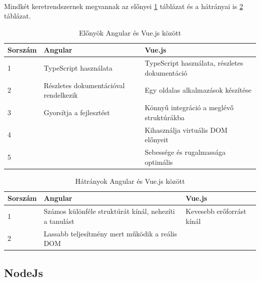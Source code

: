 	\paragraph{}
	Mindkét keretrendszernek megvannak az előnyei \ref{tab:table1} táblázat és a hátrányai is \ref{tab:table2} táblázat. 
	\begin{table}[H]
	\begin{footnotesize}
		\begin{center}
			\caption{Előnyök Angular és Vue.js között \cite{vuevsang} }
			\label{tab:table1}
			\begin{tabular}{p{2cm}|p{6cm}|p{6cm}}
				\textbf{Sorszám} & \textbf{Angular} & \textbf{Vue.js}\\
				\hline
				1 & TypeScript használata & TypeScript használata, részletes dokumentáció\\
				\hline
				2 & Részletes dokumentációval rendelkezik & Egy oldalas alkalmazások készítése \\
				\hline
				3 & Gyorsítja a fejlesztést & Könnyű integráció a meglévő struktúrákba \\
				\hline
				4 & & Kihasználja virtuális DOM előnyeit \\
				\hline
				5 & & Sebessége és rugalmassága optimális \\
			\end{tabular}
		\end{center}
	\end{footnotesize}
	\end{table}

	\begin{table}[H]
	\begin{footnotesize}
		\begin{center}
			\caption{Hátrányok Angular és Vue.js között \cite{vuevsang}}
			\label{tab:table2}
			\begin{tabular}{p{2cm}|p{6cm}|p{6cm}} 
				\textbf{Sorszám} & \textbf{Angular} & \textbf{Vue.js}\\
				\hline
				1 & Számos különféle struktúrát kínál, nehezíti a tanulást & Kevesebb erőforrást kínál\\
				\hline
				2 & Lassabb teljesítmény mert működik a reális DOM &  \\
			\end{tabular}
		\end{center}
	\end{footnotesize}
	\end{table}

	\subsection{NodeJs}
